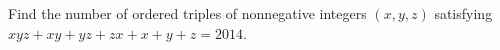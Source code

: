 Find the number of ordered triples of nonnegative integers $(x,y,z)$ satisfying $xyz+xy+yz+zx+x+y+z=2014$.
